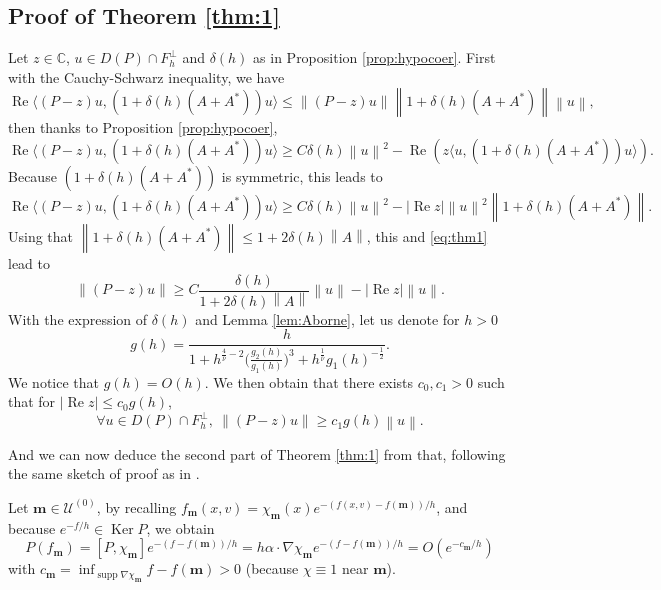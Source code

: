 \documentclass[12pt]{amsart}
\renewcommand{\Re}{\operatorname{Re}}
\newcommand{\supp}{\operatorname{supp}}
\newcommand{\C}{\mathbb C}
\newcommand{\Ker}{\operatorname{Ker}}
\def\<{\langle}
\def\>{\rangle}
\numberwithin{equation}{section}
\numberwithin{figure}{section}
\def\m{\mathbf{m}}
\newcommand{\vvert}[1]{\left\lVert#1\right\rVert}
\def\uuu{{\mathcal U}}\def\vvv{{\mathcal V}}\def\www{{\mathcal W}}\def\xxx{{\mathcal X}}
\begin{document}
\subsection{Proof of Theorem \ref{thm:1}}
Let $z\in\C$, $u\in D(P)\cap F_h^\bot$ and $\delta(h)$ as in Proposition \ref{prop:hypocoer}. First with the Cauchy-Schwarz inequality, we have
\begin{equation}\label{eq:thm1}
\Re\< (P-z)u, (1+\delta(h)(A+A^*))u \> \leq \vvert{(P-z)u}\vvert{1+\delta(h)(A+A^*)}\vvert{u},
\end{equation}
then thanks to Proposition \ref{prop:hypocoer}, 
\begin{equation*}
\Re\< (P-z)u, (1+\delta(h)(A+A^*))u \> \geq C\delta(h)\vvert{u}^2-\Re(z\< u,(1+\delta(h)(A+A^*))u\>).
\end{equation*}
Because $(1+\delta(h)(A+A^*))$ is symmetric, this leads to
\begin{equation*}
\Re\< (P-z)u, (1+\delta(h)(A+A^*))u \> \geq C\delta(h)\vvert{u}^2-|\Re z|\vvert{u}^2\vvert{1+\delta(h)(A+A^*)}.
\end{equation*}
Using that $\vvert{1+\delta(h)(A+A^*)} \leq 1 + 2\delta(h)\vvert{A}$, this and \eqref{eq:thm1} lead to
\begin{equation*}
\vvert{(P-z)u} \geq C\frac{\delta(h)}{1 + 2\delta(h)\vvert{A}}\vvert{u} - |\Re z|\vvert{u}.
\end{equation*}
With the expression of $\delta(h)$ and Lemma \ref{lem:Aborne}, let us denote for $h>0$
\begin{equation}\label{eq:g}
g(h) = \frac{h}{1 + h^{\frac{4}{\overline\nu}-2}\Big(\frac{g_2(h)}{g_1(h)}\Big)^{3} + h^{\frac1{\overline\nu}}g_1(h)^{-\frac12}}.
\end{equation}
We notice that $g(h) = O(h)$. We then obtain that there exists $c_0,c_1>0$ such that for $|\Re z| \leq c_0g(h)$,\begin{equation}\label{eq:hypoPi}
\forall u\in D(P)\cap F_h^\bot,\ \vvert{(P-z)u} \geq c_1g(h)\vvert{u}.
\end{equation}

And we can now deduce the second part of Theorem \ref{thm:1} from that, following the same sketch of proof as in \cite{No23}.

Let $\m\in\uuu^{(0)}$, by recalling $f_\m(x,v)=\chi_\m(x) e^{-(f(x,v)-f(\m))/h}$, and because $e^{-f/h}\in\Ker P$, we obtain
\begin{equation*}
P(f_\m)= [P,\chi_\m]e^{-(f-f(\m))/h} = h\alpha\cdot\nabla\chi_\m e^{-(f-f(\m))/h} = O(e^{-c_\m/h})
\end{equation*}
with $c_\m=\inf_{\supp\nabla\chi_\m} f-f(\m)>0$ (because $\chi\equiv1$ near $\m$).
\end{document}
